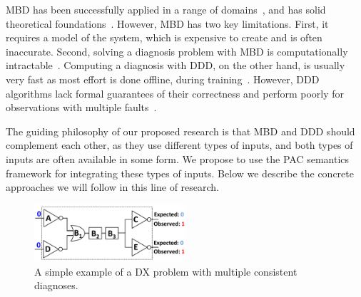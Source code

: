 \documentclass[12pt]{article}
\begin{document}
MBD has been successfully applied in a range of domains~\cite{williams96,struss2003model,wotawa2002model}, and has solid theoretical foundations~\cite{deKleer1987diagnosing,reiter1987theory}. However, MBD has two key limitations. First, it requires a model of the system, which is expensive to create and is often inaccurate. Second, solving a diagnosis problem with MBD is computationally intractable~\cite{bylander1991computational}. Computing a diagnosis with DDD, on the other hand, is usually very fast as most effort is done offline, during training~\cite{muralidharan2014fault}. However, DDD algorithms lack formal guarantees of their correctness and perform poorly for observations with multiple faults~\cite{keren2011model}. 


The guiding philosophy of our proposed research is that MBD and DDD should complement each other, as they use different types of inputs, and both types of inputs are often available in some form. 
We propose to use the PAC semantics framework for integrating these types of inputs. 
Below we describe the concrete approaches we will follow in this line of research.



\begin{figure}
    \centering
	\includegraphics[width=0.5\textwidth]{mbd-example_cropped.pdf}
    \caption{A simple example of a DX problem with multiple consistent diagnoses.}
    \label{fig:mbd-example}
\end{figure}

\end{document}
